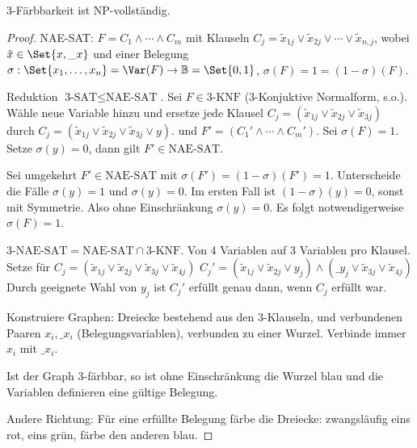 \begin{st}
    3-Färbbarkeit ist NP-vollständig.
    \begin{proof}
        NAE-SAT: $F = C_1 \land \dotsb \land C_m$ mit Klauseln $C_j = \tilde x_{1j} \lor \tilde x_{2j} \lor \dotsb \lor \tilde x_{n,j}$, wobei $\tilde x \in \Set{x, \_x}$ und einer Belegung $\sigma: \Set{x_1, \dotsc, x_n} = \Var(F) \to \B = \Set{0,1}$, $\sigma(F) = 1 = (1-\sigma)(F)$.

        Reduktion $\text{3-SAT} \le \text{NAE-SAT}$.
        Sei $F \in \text{3-KNF}$ (3-Konjuktive Normalform, s.o.).
        Wähle neue Variable hinzu und ersetze jede Klausel $C_j = (\tilde x_{1j} \lor \tilde x_{2j} \lor \tilde x_{3j})$ durch
        \begin{math}
            C_j = (\tilde x_{1j} \lor \tilde x_{2j} \lor \tilde x_{3j} \lor y).
        \end{math}
        und $F' = (C_1' \land \dotsb \land C_m')$.
        Sei $\sigma(F) = 1$.
        Setze $\sigma(y) = 0$, dann gilt $F' \in \text{NAE-SAT}$.

        Sei umgekehrt $F' \in \text{NAE-SAT}$ mit $\sigma(F') = (1-\sigma)(F') = 1$.
        Unterscheide die Fälle $\sigma(y) = 1$ und $\sigma(y) = 0$.
        Im ersten Fall ist $(1-\sigma)(y) = 0$, sonst mit Symmetrie.
        Also ohne Einschränkung $\sigma(y) = 0$.
        Es folgt notwendigerweise $\sigma(F) = 1$.

        $\text{3-NAE-SAT} = \text{NAE-SAT} \cap \text{3-KNF}$.
        Von 4 Variablen auf 3 Variablen pro Klausel.
        Setze für $C_j = (\tilde x_{1j} \lor \tilde x_{2j} \lor \tilde x_{3j} \lor \tilde x_{4j})$
        \begin{math}
            C_j' = (\tilde x_{1j} \lor \tilde x_{2j} \lor y_j) \land (\_y_{j} \lor \tilde x_{3j} \lor \tilde x_{4j})
        \end{math}
        Durch geeignete Wahl von $y_j$ ist $C_j'$ erfüllt genau dann, wenn $C_j$ erfüllt war.

        Konstruiere Graphen: Dreiecke bestehend aus den 3-Klauseln, und verbundenen Paaren $x_i, \_{x_i}$ (Belegungsvariablen), verbunden zu einer Wurzel.
        Verbinde immer $x_i$ mit $\_{x_i}$.

        Ist der Graph 3-färbbar, so ist ohne Einschränkung die Wurzel blau und die Variablen definieren eine gültige Belegung.

        Andere Richtung: Für eine erfüllte Belegung färbe die Dreiecke: zwangsläufig eins rot, eins grün, färbe den anderen blau.
    \end{proof}
\end{st}

